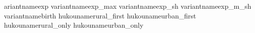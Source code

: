 \newcommand{\countrynameIDN}{Indonesia}
\newcommand{\countrynameCHN}{China}
\newcommand{\countrynameTZA}{Tanzania}
\newcommand{\treatmenturban}{Urban Location}
\newcommand{\treatmentnonag}{Non-Agricultural Sector}
\newcommand{\depvarconsumption}{Consumption}
\newcommand{\depvarincome}{Income}
\newcommand{\connectorconsumption}{in}
\newcommand{\connectorincome}{,}
\newcommand{\balmodifierunb}{}
\newcommand{\balmodifierbal}{, Balanced Panel}

\expandafter\newcommand\csname variantnameexp
\expandafter\newcommand\csname variantnameexp_max
\expandafter\newcommand\csname variantnameexp_sh
\expandafter\newcommand\csname variantnameexp_m_sh
\expandafter\newcommand\csname variantnamebirth
\expandafter\newcommand\csname hukounamerural_first
\expandafter\newcommand\csname hukounameurban_first
\expandafter\newcommand\csname hukounamerural_only
\expandafter\newcommand\csname hukounameurban_only

